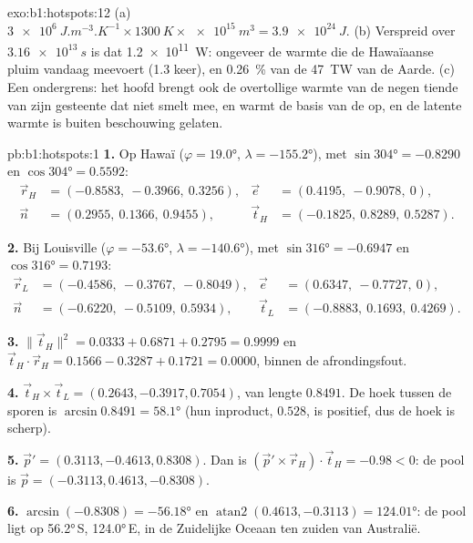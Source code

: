 \begin{solution}{exo:b1:hotspots:12}
(a) $\qty{3e6}{J.m^{-3}.K^{-1}}\times\qty{1300}{K}\times\qty{e15}{m^3} =
\qty{3.9e24}{J}$. (b) Verspreid over $\qty{3.16e13}{s}$ is dat \qty{1.2e11}{W}: ongeveer de
warmte die de Hawaïaanse pluim vandaag meevoert (1.3 keer), en \qty{0.26}{\percent}
van de \qty{47}{TW} van de Aarde. (c) Een ondergrens: het hoofd brengt ook de
overtollige warmte van de negen tiende van zijn gesteente dat niet smelt mee, en warmt de
basis van de  op, en de latente warmte is buiten beschouwing gelaten.
\end{solution}

\begin{solution}{pb:b1:hotspots:1}
\textbf{1.} Op Hawaï ($\varphi = \ang{19.0}$, $\lambda = \ang{-155.2}$),
met $\sin\ang{304} = -0.8290$ en $\cos\ang{304} = 0.5592$:
\[
\begin{aligned}
  \vec r_H &= (-0.8583,\ -0.3966,\ 0.3256), &
  \vec e &= (0.4195,\ -0.9078,\ 0),\\
  \vec n &= (0.2955,\ 0.1366,\ 0.9455), &
  \vec t_H &= (-0.1825,\ 0.8289,\ 0.5287).
\end{aligned}
\]

\textbf{2.} Bij Louisville ($\varphi = \ang{-53.6}$, $\lambda = \ang{-140.6}$),
met $\sin\ang{316} = -0.6947$ en $\cos\ang{316} = 0.7193$:
\[
\begin{aligned}
  \vec r_L &= (-0.4586,\ -0.3767,\ -0.8049), &
  \vec e &= (0.6347,\ -0.7727,\ 0),\\
  \vec n &= (-0.6220,\ -0.5109,\ 0.5934), &
  \vec t_L &= (-0.8883,\ 0.1693,\ 0.4269).
\end{aligned}
\]

\textbf{3.} $\lVert\vec t_H\rVert^2 = 0.0333 + 0.6871 + 0.2795 = 0.9999$ en
$\vec t_H\cdot\vec r_H = 0.1566 - 0.3287 + 0.1721 = 0.0000$, binnen de afrondingsfout.

\textbf{4.} $\vec t_H\times\vec t_L = (0.2643, -0.3917, 0.7054)$, van lengte
$0.8491$. De hoek tussen de sporen is $\arcsin0.8491 = \ang{58.1}$ (hun inproduct,
$0.528$, is positief, dus de hoek is scherp).

\textbf{5.} $\vec p' = (0.3113, -0.4613, 0.8308)$. Dan is
$(\vec p'\times\vec r_H)\cdot\vec t_H = -0.98 < 0$: de pool is
$\vec p = (-0.3113, 0.4613, -0.8308)$.

\textbf{6.} $\arcsin(-0.8308) = \ang{-56.18}$ en
$\operatorname{atan2}(0.4613, -0.3113) = \ang{124.01}$: de pool ligt op
\ang{56.2}\,S, \ang{124.0}\,E, in de Zuidelijke Oceaan ten zuiden van Australië.


\end{solution}
